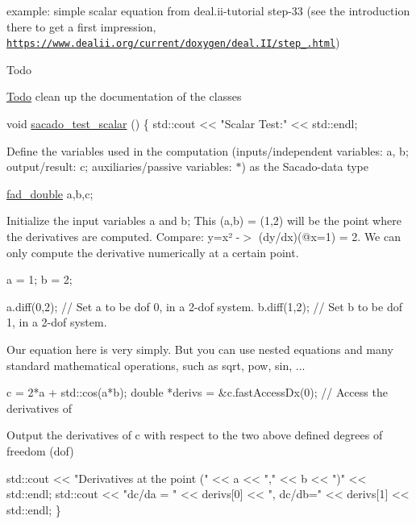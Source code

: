 \begin{DoxyEnumerate}
\item example\+: simple scalar equation from deal.\+ii-\/tutorial step-\/33 (see the introduction there to get a first impression, \href{https://www.dealii.org/current/doxygen/deal.II/step_33.html}{\tt https\+://www.\+dealii.\+org/current/doxygen/deal.\+I\+I/step\+\_.\+html}) \begin{DoxyRefDesc}{Todo}
\item[\hyperlink{todo__todo000006}{Todo}]clean up the documentation of the classes\end{DoxyRefDesc}

\end{DoxyEnumerate}


\begin{DoxyCode}
\textcolor{keywordtype}{void} \hyperlink{example__code__to__be__documented_8cc_a71b2675e62203edc430e7ffc8a365193}{sacado\_test\_scalar} ()
\{
    std::cout << \textcolor{stringliteral}{"Scalar Test:"} << std::endl;
\end{DoxyCode}
 Define the variables used in the computation (inputs/independent variables\+: a, b; output/result\+: c; auxiliaries/passive variables\+: $\ast$) as the Sacado-\/data type 
\begin{DoxyCode}
\hyperlink{example__code__to__be__documented_8cc_a868b94676739e612d9c95940e70892a9}{fad\_double} a,b,c;
\end{DoxyCode}
 Initialize the input variables a and b; This (a,b) = (1,2) will be the point where the derivatives are computed. Compare\+: y=x² -\/$>$ (dy/dx)(@x=1) = 2. We can only compute the derivative numerically at a certain point. 
\begin{DoxyCode}
 a = 1;
 b = 2;

a.diff(0,2);  \textcolor{comment}{// Set a to be dof 0, in a 2-dof system.}
b.diff(1,2);  \textcolor{comment}{// Set b to be dof 1, in a 2-dof system.}
\end{DoxyCode}
 Our equation here is very simply. But you can use nested equations and many standard mathematical operations, such as sqrt, pow, sin, ... 
\begin{DoxyCode}
c = 2*a + std::cos(a*b);
\textcolor{keywordtype}{double} *derivs = &c.fastAccessDx(0); \textcolor{comment}{// Access the derivatives of}
\end{DoxyCode}
 Output the derivatives of c with respect to the two above defined degrees of freedom (dof) 
\begin{DoxyCode}
    std::cout << \textcolor{stringliteral}{"Derivatives at the point ("} << a << \textcolor{stringliteral}{","} << b << \textcolor{stringliteral}{")"} << std::endl;
    std::cout << \textcolor{stringliteral}{"dc/da = "} << derivs[0] << \textcolor{stringliteral}{", dc/db="} << derivs[1] << std::endl;
\}
\end{DoxyCode}
